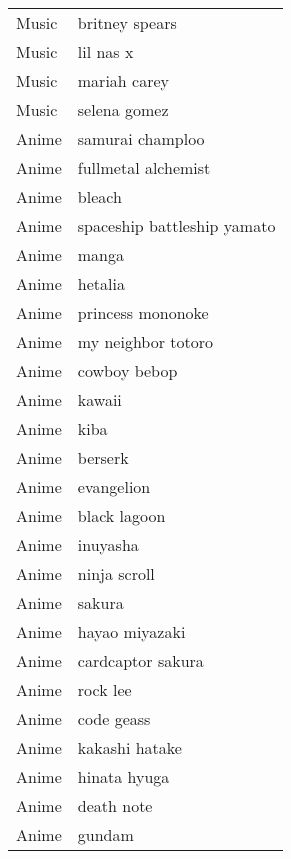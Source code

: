 \begin{supertabular}{l p{0.25\textwidth}}
            Music &                     britney spears \\
            Music &                          lil nas x \\
            Music &                       mariah carey \\
            Music &                       selena gomez \\
            Anime &                   samurai champloo \\
            Anime &                fullmetal alchemist \\
            Anime &                             bleach \\
            Anime &        spaceship battleship yamato \\
            Anime &                              manga \\
            Anime &                            hetalia \\
            Anime &                  princess mononoke \\
            Anime &                 my neighbor totoro \\
            Anime &                       cowboy bebop \\
            Anime &                             kawaii \\
            Anime &                               kiba \\
            Anime &                            berserk \\
            Anime &                         evangelion \\
            Anime &                       black lagoon \\
            Anime &                           inuyasha \\
            Anime &                       ninja scroll \\
            Anime &                             sakura \\
            Anime &                     hayao miyazaki \\
            Anime &                  cardcaptor sakura \\
            Anime &                           rock lee \\
            Anime &                         code geass \\
            Anime &                     kakashi hatake \\
            Anime &                       hinata hyuga \\
            Anime &                         death note \\
            Anime &                             gundam \\
\bottomrule
\end{supertabular}

